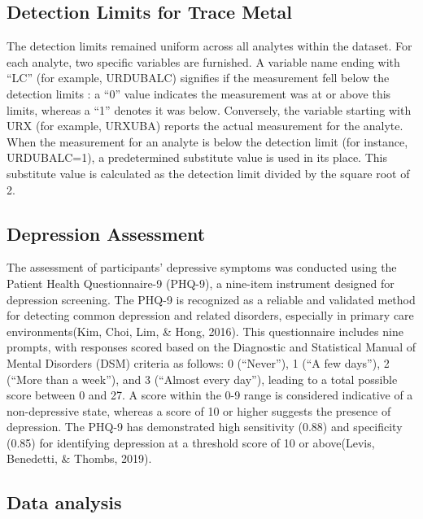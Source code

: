 \documentclass[
  man]{apa6}
\begin{document}
\hypertarget{detection-limits-for-trace-metal}{%
\subsection{Detection Limits for Trace Metal}\label{detection-limits-for-trace-metal}}

The detection limits remained uniform across all analytes within the dataset. For each analyte, two specific variables are furnished. A variable name ending with ``LC'' (for example, URDUBALC) signifies if the measurement fell below the detection limits : a ``0'' value indicates the measurement was at or above this limits, whereas a ``1'' denotes it was below. Conversely, the variable starting with URX (for example, URXUBA) reports the actual measurement for the analyte. When the measurement for an analyte is below the detection limit (for instance, URDUBALC=1), a predetermined substitute value is used in its place. This substitute value is calculated as the detection limit divided by the square root of 2.

\hypertarget{depression-assessment}{%
\subsection{Depression Assessment}\label{depression-assessment}}

The assessment of participants' depressive symptoms was conducted using the Patient Health Questionnaire-9 (PHQ-9), a nine-item instrument designed for depression screening. The PHQ-9 is recognized as a reliable and validated method for detecting common depression and related disorders, especially in primary care environments(Kim, Choi, Lim, \& Hong, 2016). This questionnaire includes nine prompts, with responses scored based on the Diagnostic and Statistical Manual of Mental Disorders (DSM) criteria as follows: 0 (``Never''), 1 (``A few days''), 2 (``More than a week''), and 3 (``Almost every day''), leading to a total possible score between 0 and 27. A score within the 0-9 range is considered indicative of a non-depressive state, whereas a score of 10 or higher suggests the presence of depression. The PHQ-9 has demonstrated high sensitivity (0.88) and specificity (0.85) for identifying depression at a threshold score of 10 or above(Levis, Benedetti, \& Thombs, 2019).

\hypertarget{data-analysis}{%
\subsection{Data analysis}\label{data-analysis}}
\end{document}
